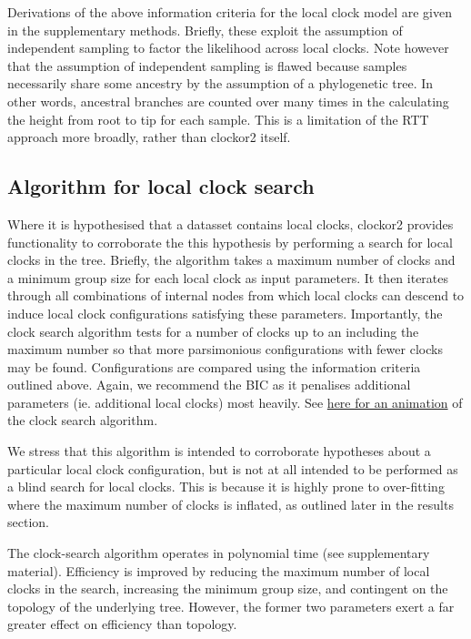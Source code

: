 \documentclass{article}
\begin{document}
Derivations of the above information criteria for the local clock model are given in the supplementary methods. Briefly, these exploit the assumption of independent sampling to factor the likelihood across local clocks. Note however that the assumption of independent sampling is flawed because samples necessarily share some ancestry by the assumption of a phylogenetic tree. In other words, ancestral branches are counted over many times in the calculating the height from root to tip for each sample. This is a limitation of the RTT approach more broadly, rather than clockor2 itself.


\subsection*{Algorithm for local clock search}
Where it is hypothesised that a datasset contains local clocks, clockor2 provides functionality to corroborate the this hypothesis by performing a search for local clocks in the tree. Briefly, the algorithm takes a maximum number of clocks and a minimum group size for each local clock as input parameters. It then iterates through all combinations of internal nodes from which local clocks can descend to induce local clock configurations satisfying these parameters. Importantly, the clock search algorithm tests for a number of clocks up to an including the maximum number so that more parsimonious configurations with fewer clocks may be found. Configurations are compared using the information criteria outlined above. Again, we recommend the BIC as it penalises additional parameters (ie. additional local clocks) most heavily. See \href{https://github.com/LeoFeatherstone/clockor2Paper/blob/main/figures/clockSearchEg2Clocks.gif}{here for an animation} of the clock search algorithm. 

We stress that this algorithm is intended to corroborate hypotheses about a particular local clock configuration, but is not at all intended to be performed as a blind search for local clocks. This is because it is highly prone to over-fitting where the maximum number of clocks is inflated, as outlined later in the results section.

The clock-search algorithm operates in polynomial time (see supplementary material). Efficiency is improved by reducing the maximum number of local clocks in the search, increasing the minimum group size, and contingent on the topology of the underlying tree. However, the former two parameters exert a far greater effect on efficiency than topology.
\end{document}

